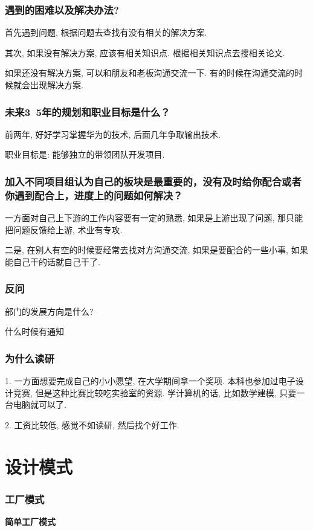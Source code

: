 \documentclass[UTF8]{ctexart}
\begin{document}
\subsubsection{遇到的困难以及解决办法?}
首先遇到问题, 根据问题去查找有没有相关的解决方案.

其次, 如果没有解决方案, 应该有相关知识点. 根据相关知识点去搜相关论文.

如果还没有解决方案, 可以和朋友和老板沟通交流一下. 有的时候在沟通交流的时候就会出现解决方案.

\subsubsection{未来3~5年的规划和职业目标是什么？}

前两年, 好好学习掌握华为的技术, 后面几年争取输出技术.

职业目标是: 能够独立的带领团队开发项目.

\subsubsection{加入不同项目组认为自己的板块是最重要的，没有及时给你配合或者你遇到配合上，进度上的问题如何解决？}

一方面对自己上下游的工作内容要有一定的熟悉, 如果是上游出现了问题, 那只能把问题反馈给上游, 术业有专攻.

二是, 在别人有空的时候要经常去找对方沟通交流, 如果是要配合的一些小事, 如果能自己干的话就自己干了.

\subsubsection{反问}

部门的发展方向是什么?

什么时候有通知


\subsubsection{为什么读研}
1. 一方面想要完成自己的小小愿望, 在大学期间拿一个奖项. 本科也参加过电子设计竞赛, 但是这种比赛比较吃实验室的资源. 学计算机的话, 比如数学建模, 只要一台电脑就可以了.

2. 工资比较低, 感觉不如读研, 然后找个好工作.


\section{设计模式}
\subsubsection{工厂模式}
\textbf{简单工厂模式}
\end{document}
